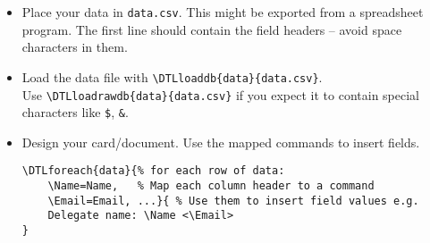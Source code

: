 \begin{itemize}[leftmargin=0pt,topsep=6pt,itemsep=0pt]
\tiny
\item Place your data in \texttt{data.csv}. This might be exported from a spreadsheet program. The first line should contain the field headers -- avoid space characters in them. 

\item Load the data file with \verb|\DTLloaddb{data}{data.csv}|.\\Use \verb|\DTLloadrawdb{data}{data.csv}| if you expect it to contain special characters like \verb|$|, \verb|&|.

\item Design your card/document. Use the mapped commands to insert fields.
\vspace{-3pt}
\begin{lstlisting}
\DTLforeach{data}{% for each row of data:
    \Name=Name,   % Map each column header to a command
    \Email=Email, ...}{ % Use them to insert field values e.g.
    Delegate name: \Name <\Email>  
}
\end{lstlisting}
\end{itemize}

\clearpage
